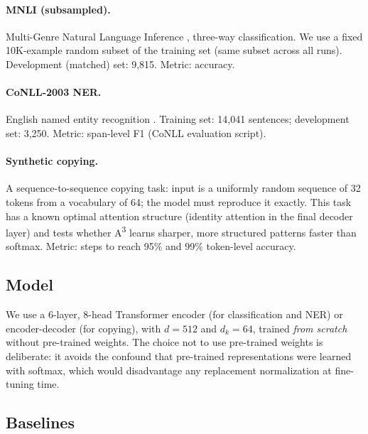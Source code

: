 \documentclass[11pt]{article}
\newcommand{\AAA}{\textsc{A\textsuperscript{3}}}
\begin{document}
\paragraph{MNLI (subsampled).} Multi-Genre Natural Language Inference \citep{williams2018mnli}, three-way classification. We use a fixed 10K-example random subset of the training set (same subset across all runs). Development (matched) set: 9,815. Metric: accuracy.

\paragraph{CoNLL-2003 NER.} English named entity recognition \citep{tjong2003conll}. Training set: 14,041 sentences; development set: 3,250. Metric: span-level F1 (CoNLL evaluation script).

\paragraph{Synthetic copying.} A sequence-to-sequence copying task: input is a uniformly random sequence of 32 tokens from a vocabulary of 64; the model must reproduce it exactly. This task has a known optimal attention structure (identity attention in the final decoder layer) and tests whether \AAA{} learns sharper, more structured patterns faster than softmax. Metric: steps to reach 95\% and 99\% token-level accuracy.

\subsection{Model}

We use a 6-layer, 8-head Transformer encoder (for classification and NER) or encoder-decoder (for copying), with $d=512$ and $d_k=64$, trained \emph{from scratch} without pre-trained weights. The choice not to use pre-trained weights is deliberate: it avoids the confound that pre-trained representations were learned with softmax, which would disadvantage any replacement normalization at fine-tuning time.

\subsection{Baselines}
\end{document}
